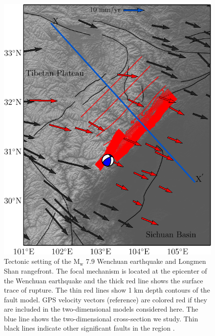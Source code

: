 \documentclass[12pt]{article}
\begin{document}
\begin{figure}[h!]
    \centering
    \includegraphics{figs/lms_map_all.pdf}
    \caption{Tectonic setting of the $\textrm{M}_{\textrm{w}}$ 7.9 Wenchuan earthquake and Longmen Shan rangefront. The focal mechanism is located at the epicenter of the Wenchuan earthquake and the thick red line shows the surface trace of rupture. The thin red lines show 1 km depth contours of the fault model. GPS velocity vectors (reference) are colored red if they are included in the two-dimensional models considered here. The blue line shows the two-dimensional cross-section we study. Thin black lines indicate other significant faults in the region \citep{Taylor09}.}
    \label{fig:regional_map}
\end{figure}
\end{document}

